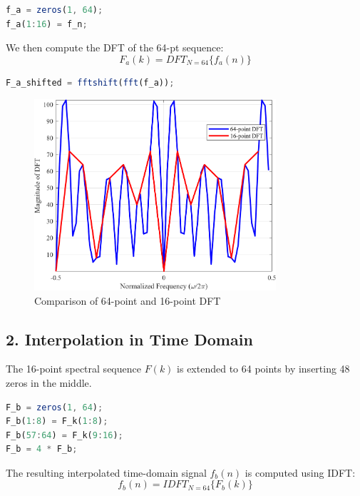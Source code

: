 \documentclass[12pt]{article}
\begin{document}
\begin{lstlisting}[language=Octave, caption=Zero-Padded Time Sequence]
f_a = zeros(1, 64);
f_a(1:16) = f_n;
\end{lstlisting}

\vspace{0.5 cm}
We then compute the DFT of the 64-pt sequence:
\[ F_a(k) = DFT_{N = 64} \{f_a(n)\} \]

\begin{lstlisting}[language=Octave, caption=DFT of 64-pt Sequence]
F_a_shifted = fftshift(fft(f_a));
\end{lstlisting}

\begin{figure}[H]
    \centering
    \includegraphics[width=0.8\textwidth]{F_a.png}
    \caption{Comparison of 64-point and 16-point DFT}
\end{figure}


\newpage
\subsection*{2. Interpolation in Time Domain}
The 16-point spectral sequence $F(k)$ is extended to 64 points by inserting 48 zeros in the middle. 

\begin{lstlisting}[language=Octave, caption=Zero-Padded Frequency Sequence]
F_b = zeros(1, 64);
F_b(1:8) = F_k(1:8);
F_b(57:64) = F_k(9:16);
F_b = 4 * F_b;
\end{lstlisting}

\vspace{0.5 cm}
The resulting interpolated time-domain signal $f_b(n)$ is computed using IDFT:
\[  f_b(n) = IDFT_{N = 64} \{F_b(k)\} \]
\end{document}
